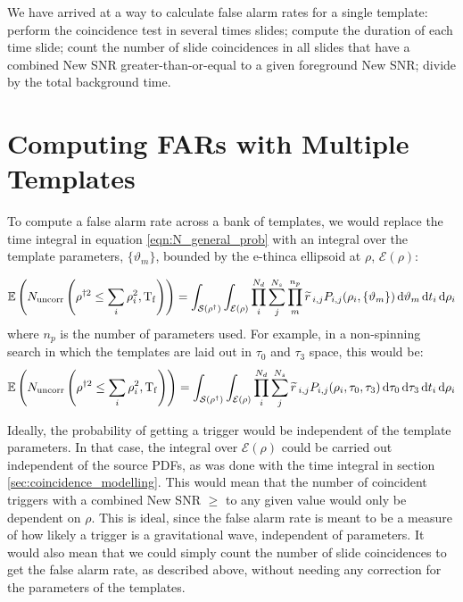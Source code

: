We have arrived at a way to calculate false alarm rates for a single template: perform the coincidence test in several times slides; compute the duration of each time slide; count the number of slide coincidences in all slides that have a combined New \ac{SNR} greater-than-or-equal to a given foreground New \ac{SNR}; divide by the total background time.

\section{Computing FARs with Multiple Templates}
\label{sec:far-multiple_templates}

To compute a false alarm rate across a bank of templates, we would replace the time integral in equation \ref{eqn:N_general_prob} with an integral over the template parameters, $\{\vartheta_m\}$, bounded by the e-thinca ellipsoid at $\rho$, $\mathcal{E}(\rho)$:

\begin{equation}
\mathbb{E}\left(N_{\mathrm{uncorr}}\left(\rho^{\dagger2} \leq \sum_i\rho_i^2, \mathrm{T_f} \right)\right) = \int_{\mathcal{S}(\rho^\dagger)} \int_{\mathcal{E(\rho)}} \prod_i^{N_d} \sum_j^{N_s}  \prod_{m}^{n_p} \widetilde{r}\,_{i,j} P_{i,j}(\rho_i, \{\vartheta_m \}) \,\mathrm{d} \vartheta_m \,\mathrm{d} t_i \,\mathrm{d} \rho_i
\end{equation}
where $n_p$ is the number of parameters used. For example, in a non-spinning search in which the templates are laid out in $\tau_0$ and $\tau_3$ space, this would be:
\begin{equation}
\mathbb{E}\left(N_{\mathrm{uncorr}}\left(\rho^{\dagger2} \leq \sum_i\rho_i^2, \mathrm{T_f} \right)\right) = \int_{\mathcal{S}(\rho^\dagger)} \int_{\mathcal{E(\rho)}} \prod_i^{N_d} \sum_j^{N_s}  \widetilde{r}\,_{i,j} P_{i,j}(\rho_i, \tau_0, \tau_3) \,\mathrm{d} \tau_0 \,\mathrm{d} \tau_3 \,\mathrm{d} t_i \,\mathrm{d} \rho_i
\end{equation}

Ideally, the probability of getting a trigger would be independent of the template parameters. In that case, the integral over $\mathcal{E}(\rho)$ could be carried out independent of the source \acp{PDF}, as was done with the time integral in section \ref{sec:coincidence_modelling}. This would mean that the number of coincident triggers with a combined New \ac{SNR} $\geq$ to any given value would only be dependent on $\rho$. This is ideal, since the false alarm rate is meant to be a measure of how likely a trigger is a gravitational wave, independent of parameters. It would also mean that we could simply count the number of slide coincidences to get the false alarm rate, as described above, without needing any correction for the parameters of the templates.

